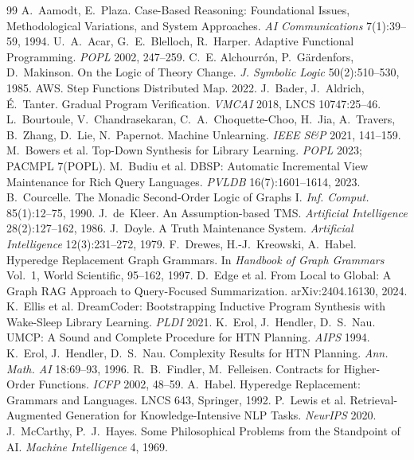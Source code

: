 \documentclass[11pt]{article}
\begin{document}
\begin{thebibliography}{99}
 A.~Aamodt, E.~Plaza. Case-Based Reasoning: Foundational Issues, Methodological Variations, and System Approaches. \emph{AI Communications} 7(1):39--59, 1994.
 U.~A.~Acar, G.~E.~Blelloch, R.~Harper. Adaptive Functional Programming. \emph{POPL} 2002, 247--259.
 C.~E. Alchourr\'on, P.~G\"ardenfors, D.~Makinson. On the Logic of Theory Change. \emph{J. Symbolic Logic} 50(2):510--530, 1985.
 AWS. Step Functions Distributed Map. 2022.
 J.~Bader, J.~Aldrich, \'E.~Tanter. Gradual Program Verification. \emph{VMCAI} 2018, LNCS 10747:25--46.
 L.~Bourtoule, V.~Chandrasekaran, C.~A.~Choquette-Choo, H.~Jia, A.~Travers, B.~Zhang, D.~Lie, N.~Papernot. Machine Unlearning. \emph{IEEE S\&P} 2021, 141--159.
 M.~Bowers et al. Top-Down Synthesis for Library Learning. \emph{POPL} 2023; PACMPL 7(POPL).
 M.~Budiu et al. DBSP: Automatic Incremental View Maintenance for Rich Query Languages. \emph{PVLDB} 16(7):1601--1614, 2023.
 B.~Courcelle. The Monadic Second-Order Logic of Graphs I. \emph{Inf. Comput.} 85(1):12--75, 1990.
 J.~de~Kleer. An Assumption-based TMS. \emph{Artificial Intelligence} 28(2):127--162, 1986.
 J.~Doyle. A Truth Maintenance System. \emph{Artificial Intelligence} 12(3):231--272, 1979.
 F.~Drewes, H.-J.~Kreowski, A.~Habel. Hyperedge Replacement Graph Grammars. In \emph{Handbook of Graph Grammars} Vol.~1, World Scientific, 95--162, 1997.
 D.~Edge et al. From Local to Global: A Graph RAG Approach to Query-Focused Summarization. arXiv:2404.16130, 2024.
 K.~Ellis et al. DreamCoder: Bootstrapping Inductive Program Synthesis with Wake-Sleep Library Learning. \emph{PLDI} 2021.
 K.~Erol, J.~Hendler, D.~S.~Nau. UMCP: A Sound and Complete Procedure for HTN Planning. \emph{AIPS} 1994.
 K.~Erol, J.~Hendler, D.~S.~Nau. Complexity Results for HTN Planning. \emph{Ann. Math. AI} 18:69--93, 1996.
 R.~B.~Findler, M.~Felleisen. Contracts for Higher-Order Functions. \emph{ICFP} 2002, 48--59.
 A.~Habel. Hyperedge Replacement: Grammars and Languages. LNCS 643, Springer, 1992.
 P.~Lewis et al. Retrieval-Augmented Generation for Knowledge-Intensive NLP Tasks. \emph{NeurIPS} 2020.
 J.~McCarthy, P.~J.~Hayes. Some Philosophical Problems from the Standpoint of AI. \emph{Machine Intelligence} 4, 1969.

\end{thebibliography}
\end{document}
